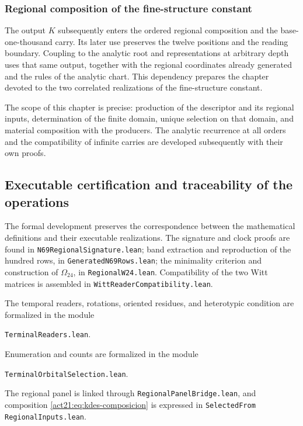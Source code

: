 \subsubsection{Regional composition of the fine-structure constant}

The output $K$ subsequently enters the ordered regional
composition and the base-one-thousand carry. Its later use preserves the
twelve positions and the reading boundary. Coupling to the analytic
root and representations at arbitrary depth uses that
same output, together with the regional coordinates already generated and the
rules of the analytic chart. This dependency prepares the chapter
devoted to the two correlated realizations of the fine-structure
constant.

The scope of this chapter is precise: production of the descriptor and
its regional inputs, determination of the finite domain,
unique selection on that domain, and material composition with the
producers. The analytic recurrence at all orders and the
compatibility of infinite carries are developed subsequently with their
own proofs.

\subsection{Executable certification and traceability of the operations}

The formal development preserves the correspondence between the
mathematical definitions and their executable realizations. The signature
and clock proofs are found in
\texttt{N69}\allowbreak\texttt{Regional}\allowbreak\texttt{Signature.lean}; band extraction and
reproduction of the hundred rows, in
\texttt{Generated}\allowbreak\texttt{N69}\allowbreak\texttt{Rows.lean}; the minimality criterion and construction
of $\Omega_{24}$, in \texttt{Regional}\allowbreak\texttt{W24.lean}. Compatibility of
the two Witt matrices is assembled in
\texttt{Witt}\allowbreak\texttt{Reader}\allowbreak\texttt{Compatibility.lean}.

The temporal readers, rotations, oriented residues, and
heterotypic condition are formalized in the module
\begin{center}
\texttt{TerminalReaders.lean}.
\end{center}
Enumeration and counts are formalized in the module
\begin{center}
\texttt{TerminalOrbitalSelection.lean}.
\end{center}
The regional
panel is linked through \texttt{Regional}\allowbreak\texttt{Panel}\allowbreak\texttt{Bridge.lean}, and
composition \eqref{act21:eq:kdes-composicion} is expressed in
\texttt{Selected}\allowbreak\texttt{From}\allowbreak%
\texttt{Regional}\allowbreak\texttt{Inputs.lean}.

